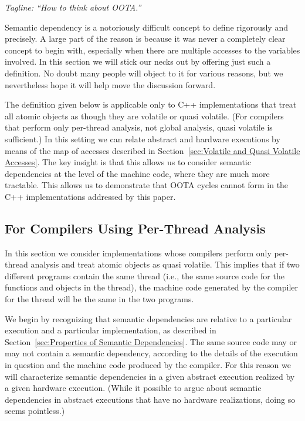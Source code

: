 \emph{ Tagline: ``How to think about OOTA.'' }

Semantic dependency is a notoriously difficult concept to define
rigorously and precisely.
A large part of the reason is because it was never a completely clear
concept to begin with, especially when there are multiple accesses to
the variables involved.
In this section we will stick our necks out by offering just such a
definition.
No doubt many people will object to it for various reasons, but we
nevertheless hope it will help move the discussion forward.

The definition given below is applicable only to C++ implementations
that treat all atomic objects as though they are volatile or
quasi volatile.
(For compilers that perform only per-thread analysis, not global
analysis, quasi volatile is sufficient.)
In this setting we can relate abstract and hardware executions by
means of the map of accesses described in
Section~\ref{sec:Volatile and Quasi Volatile Accesses}.
The key insight is that this allows us to consider semantic
dependencies at the level of the machine code, where they are much
more tractable.
This allows us to demonstrate that OOTA cycles cannot form
in the C++ implementations addressed by this paper.

\subsection{For Compilers Using Per-Thread Analysis}
\label{sec:For Compilers Using Per-Thread Analysis}

In this section we consider implementations whose compilers perform
only per-thread analysis and treat atomic objects as
quasi volatile.
This implies that if two different programs contain the same thread
(i.e., the same source code for the functions and objects in the thread), the
machine code generated by the compiler for the thread will be the
same in the two programs.

We begin by recognizing that semantic dependencies are relative to a
particular execution and a particular implementation,
as described in Section~\ref{sec:Properties of Semantic Dependencies}.
The same source code may or may not contain a semantic dependency,
according to the details of the execution in question and the
machine code produced by the compiler.
For this reason we will characterize semantic dependencies in a given
abstract execution realized by a given hardware execution.
(While it possible to argue about semantic dependencies in abstract
executions that have no hardware realizations, doing so seems pointless.)

